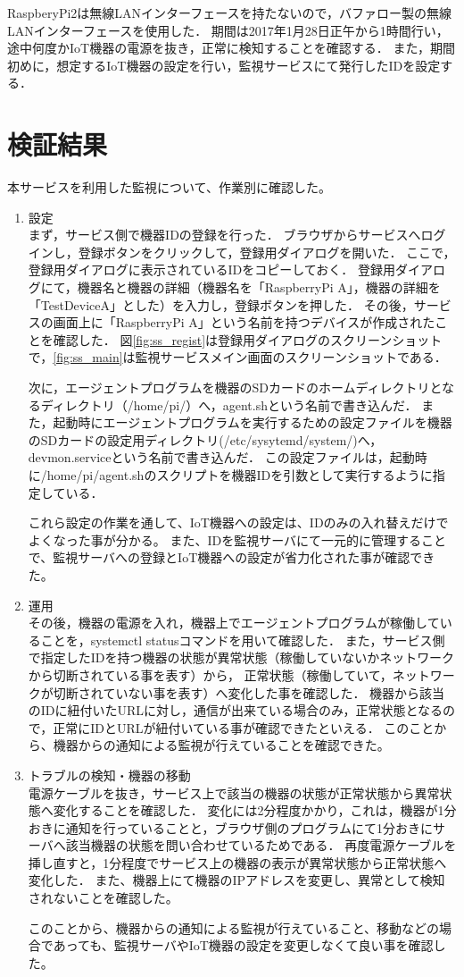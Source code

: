 RaspberyPi2は無線LANインターフェースを持たないので，バファロー製の無線LANインターフェースを使用した．
期間は2017年1月28日正午から1時間行い，途中何度かIoT機器の電源を抜き，正常に検知することを確認する．
また，期間初めに，想定するIoT機器の設定を行い，監視サービスにて発行したIDを設定する．

\section{検証結果}
本サービスを利用した監視について、作業別に確認した。
\begin{enumerate}
\item 設定\\
まず，サービス側で機器IDの登録を行った．
ブラウザからサービスへログインし，登録ボタンをクリックして，登録用ダイアログを開いた．
ここで，登録用ダイアログに表示されているIDをコピーしておく．
登録用ダイアログにて，機器名と機器の詳細（機器名を「RaspberryPi A」，機器の詳細を「TestDeviceA」とした）を入力し，登録ボタンを押した．
その後，サービスの画面上に「RaspberryPi A」という名前を持つデバイスが作成されたことを確認した．
図\ref{fig:ss_regist}は登録用ダイアログのスクリーンショットで，\ref{fig:ss_main}は監視サービスメイン画面のスクリーンショットである．
\medskip

次に，エージェントプログラムを機器のSDカードのホームディレクトリとなるディレクトリ（/home/pi/）へ，agent.shという名前で書き込んだ．
また，起動時にエージェントプログラムを実行するための設定ファイルを機器のSDカードの設定用ディレクトリ(/etc/sysytemd/system/)へ，devmon.serviceという名前で書き込んだ．
この設定ファイルは，起動時に/home/pi/agent.shのスクリプトを機器IDを引数として実行するように指定している．
\medskip

これら設定の作業を通して、IoT機器への設定は、IDのみの入れ替えだけでよくなった事が分かる。
また、IDを監視サーバにて一元的に管理することで、監視サーバへの登録とIoT機器への設定が省力化された事が確認できた。
\item 運用\\
その後，機器の電源を入れ，機器上でエージェントプログラムが稼働していることを，systemctl statusコマンドを用いて確認した．
また，サービス側で指定したIDを持つ機器の状態が異常状態（稼働していないかネットワークから切断されている事を表す）から，
正常状態（稼働していて，ネットワークが切断されていない事を表す）へ変化した事を確認した．
機器から該当のIDに紐付いたURLに対し，通信が出来ている場合のみ，正常状態となるので，正常にIDとURLが紐付いている事が確認できたといえる．
このことから、機器からの通知による監視が行えていることを確認できた。
\item トラブルの検知・機器の移動\\
電源ケーブルを抜き，サービス上で該当の機器の状態が正常状態から異常状態へ変化することを確認した．
変化には2分程度かかり，これは，機器が1分おきに通知を行っていることと，ブラウザ側のプログラムにて1分おきにサーバへ該当機器の状態を問い合わせているためである．
再度電源ケーブルを挿し直すと，1分程度でサービス上の機器の表示が異常状態から正常状態へ変化した．
また、機器上にて機器のIPアドレスを変更し、異常として検知されないことを確認した。

このことから、機器からの通知による監視が行えていること、移動などの場合であっても、監視サーバやIoT機器の設定を変更しなくて良い事を確認した。
\end{enumerate}
